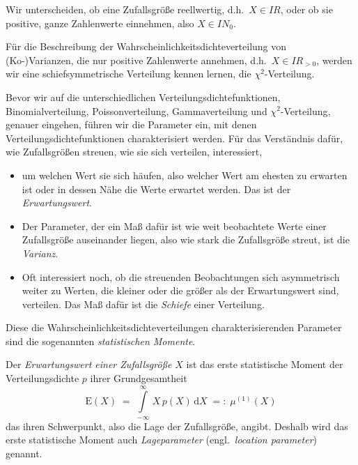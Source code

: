 Wir unterscheiden, ob eine Zufallsgröße reellwertig, d.h.\ $X \in I \!\! R$,
oder ob sie positive, ganze Zahlenwerte einnehmen, also $X \in I \!\! N_0$.

Für die Beschreibung der Wahrscheinlichkeitsdichteverteilung von (Ko-)Varianzen, die nur positive
Zahlenwerte annehmen, d.h.\ $X \in I \!\! R_{> 0}$,
werden wir eine schiefsymmetrische Verteilung kennen lernen, die $\chi^2$-Verteilung.

Bevor wir auf die unterschiedlichen Verteilungsdichtefunktionen, Binomialverteilung,
Poissonverteilung, Gammaverteilung und $\chi^2$-Verteilung,
genauer eingehen, führen wir die Parameter ein, mit denen
Verteilungsdichtefunktionen charakterisiert werden.
Für das Verständnis dafür, wie Zufallsgrößen streuen, wie sie sich verteilen, interessiert,
\begin{itemize}
\item um welchen
Wert sie sich häufen, also welcher Wert am ehesten zu erwarten ist oder in dessen Nähe die Werte
erwartet werden. Das ist der \textsl{Erwartungswert}.
\item Der Parameter, der ein Maß dafür ist wie weit beobachtete Werte einer Zufallsgröße auseinander liegen, also wie stark die Zufallsgröße streut, ist die \textsl{Varianz}.
\item Oft interessiert noch, ob die streuenden Beobachtungen sich asymmetrisch weiter zu Werten, die kleiner
oder die größer als der Erwartungswert sind, verteilen. Das Maß dafür ist die \textsl{Schiefe} einer Verteilung.
\end{itemize}
Diese die Wahrscheinlichkeitsdichteverteilungen charakterisierenden Parameter sind die
sogenannten \textsl{statistischen Momente}.

Der \textsl{Erwartungswert einer Zufallsgröße} $X$ ist das erste statistische Moment
der Verteilungsdichte $p$ ihrer Grundgesamtheit
\begin{equation}
\mathrm{E}(X) \; = \; \int\limits_{-\infty}^{\infty} \, X \, p(X) \, \mathrm{d} X \; =: \; \mu^{(1)}(X)
\end{equation}
das ihren Schwerpunkt, also die Lage der Zufallsgröße, angibt. Deshalb wird das erste
statistische Moment auch \textsl{Lageparameter} (engl.\ \textsl{location parameter}) genannt.

